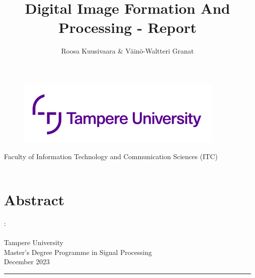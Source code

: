 \documentclass[12pt,a4paper,english
]{tunithesis}
\author{Roosa Kuusivaara \& Väinö-Waltteri Granat}
\title{Digital Image Formation And Processing - Report} %
\begin{document}
\makeatletter

\thispagestyle{empty}
\vspace*{-.5cm}\noindent

\begin{figure}
    \vspace{-1.3cm}
    \advance\leftskip-2.5cm
    \noindent\includegraphics{img/tunilogo.png}
\end{figure}
 
\vspace{2.5cm}
\begin{flushright}
\noindent\textsf{\LARGE{\@author}}

\noindent\vspace{0.5cm}

\noindent\Huge{\textsf{\textbf{\textcolor{tunipurple}{\@title}}}}
\end{flushright}
\vspace{13.7cm} %

\begin{flushright}  
    \begin{spacing}{1.0}
      \textsf{Faculty of Information Technology and Communication Sciences (ITC)\\
      \@thesistype\\}
    \end{spacing}
\end{flushright}

\if@twoside
\clearpage
\fi



\chapter*{Abstract}
\begin{spacing}{1.0}
\noindent \@author: \@title\\
\@thesistype\\
Tampere University\\
Master’s Degree Programme in Signal Processing\\
December 2023
\end{spacing}
\noindent\rule{12cm}{0.4pt}
\end{document}
